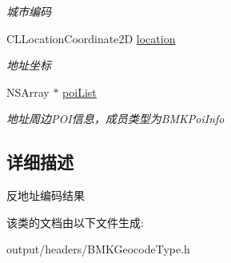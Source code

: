 \begin{DoxyCompactItemize}
\begin{DoxyCompactList}\small\item\em 城市编码 \end{DoxyCompactList}\item 
\hypertarget{interface_b_m_k_reverse_geo_code_result_ae7afa6e87f1c8fc31a17dbccf15588da}{}C\+L\+Location\+Coordinate2\+D \hyperlink{interface_b_m_k_reverse_geo_code_result_ae7afa6e87f1c8fc31a17dbccf15588da}{location}\label{interface_b_m_k_reverse_geo_code_result_ae7afa6e87f1c8fc31a17dbccf15588da}

\begin{DoxyCompactList}\small\item\em 地址坐标 \end{DoxyCompactList}\item 
\hypertarget{interface_b_m_k_reverse_geo_code_result_a6c9fd2997504cff3b99569f5f89dba20}{}N\+S\+Array $\ast$ \hyperlink{interface_b_m_k_reverse_geo_code_result_a6c9fd2997504cff3b99569f5f89dba20}{poi\+List}\label{interface_b_m_k_reverse_geo_code_result_a6c9fd2997504cff3b99569f5f89dba20}

\begin{DoxyCompactList}\small\item\em 地址周边\+P\+O\+I信息，成员类型为\+B\+M\+K\+Poi\+Info \end{DoxyCompactList}\end{DoxyCompactItemize}


\subsection{详细描述}
反地址编码结果 

该类的文档由以下文件生成\+:\begin{DoxyCompactItemize}
\item 
output/headers/B\+M\+K\+Geocode\+Type.\+h\end{DoxyCompactItemize}
